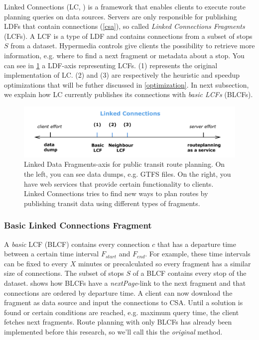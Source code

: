 \documentclass[twocolumn]{phdsymp} %
\begin{document}
Linked Connections (LC, \cite{colpaert_iswc_2015}) is a framework that enables clients to execute route planning queries on data sources. Servers are only responsible for publishing LDFs that contain connections (\cref{csa}), so called \textit{Linked Connections Fragments} (LCFs). A LCF is a type of LDF and contains connections from a subset of stops $S$ from a dataset. Hypermedia controls give clients the possibility to retrieve more information, e.g. where to find a next fragment or metadata about a stop.
You can see in \cref{LDF-asFinalAbstract} a LDF-axis representing LCFs. (1) represents the original implementation of LC. (2) and (3) are respectively the heuristic and speedup optimizations that will be futher discussed in \cref{optimization}. In next subsection, we explain how LC currently publishes its connections with \textit{basic LCFs} (BLCFs).

\begin{figure}[ht]
\begin{center}
	\includegraphics[width=.50\textwidth]{LDF-asFinalAbstract}
	\caption{\label{LDF-asFinalAbstract}Linked Data Fragments-axis for public transit route planning. On the left, you can see data dumps, e.g. GTFS files. On the right, you have web services that provide certain functionality to clients. Linked Connections tries to find new ways to plan routes by publishing transit data using different types of fragments.}
\end{center}
\end{figure}

\subsubsection{Basic Linked Connections Fragment}

A \textit{basic} LCF (BLCF) contains every connection $c$ that has a departure time between a certain time interval $F_{start}$ and $F_{end}$. For example, these time intervals can be fixed to every $X$ minutes or precalculated so every fragment has a similar size of connections. The subset of stops $S$ of a BLCF contains every stop of the dataset.  shows how BLCFs have a \textit{nextPage}-link to the next fragment and that connections are ordered by departure time.
A client can now download the fragment as data source and input the connections to CSA. Until a solution is found or certain conditions are reached, e.g. maximum query time, the client fetches next fragments.
Route planning with only BLCFs has already been implemented before this research, so we'll call this the \textit{original} method.
\end{document}
